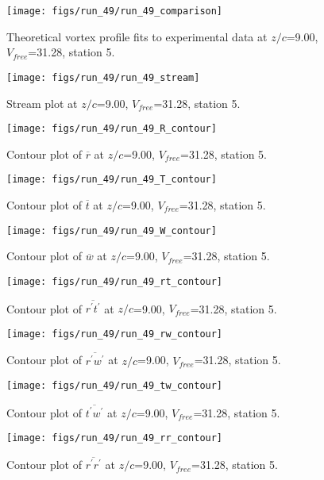 \begin{figure}[H]
\centering
\texttt{[image: figs/run\_49/run\_49\_comparison]}
\caption{Theoretical vortex profile fits to experimental data at $z/c$=9.00, $V_{free}$=31.28, station 5.}
\end{figure}


\begin{figure}[H]
\centering
\texttt{[image: figs/run\_49/run\_49\_stream]}
\caption{Stream plot at $z/c$=9.00, $V_{free}$=31.28, station 5.}
\end{figure}


\begin{figure}[H]
\centering
\texttt{[image: figs/run\_49/run\_49\_R\_contour]}
\caption{Contour plot of $\overline{r}$ at $z/c$=9.00, $V_{free}$=31.28, station 5.}
\end{figure}


\begin{figure}[H]
\centering
\texttt{[image: figs/run\_49/run\_49\_T\_contour]}
\caption{Contour plot of $\overline{t}$ at $z/c$=9.00, $V_{free}$=31.28, station 5.}
\end{figure}


\begin{figure}[H]
\centering
\texttt{[image: figs/run\_49/run\_49\_W\_contour]}
\caption{Contour plot of $\overline{w}$ at $z/c$=9.00, $V_{free}$=31.28, station 5.}
\end{figure}


\begin{figure}[H]
\centering
\texttt{[image: figs/run\_49/run\_49\_rt\_contour]}
\caption{Contour plot of $\overline{r^\prime t^\prime}$ at $z/c$=9.00, $V_{free}$=31.28, station 5.}
\end{figure}


\begin{figure}[H]
\centering
\texttt{[image: figs/run\_49/run\_49\_rw\_contour]}
\caption{Contour plot of $\overline{r^\prime w^\prime}$ at $z/c$=9.00, $V_{free}$=31.28, station 5.}
\end{figure}


\begin{figure}[H]
\centering
\texttt{[image: figs/run\_49/run\_49\_tw\_contour]}
\caption{Contour plot of $\overline{t^\prime w^\prime}$ at $z/c$=9.00, $V_{free}$=31.28, station 5.}
\end{figure}


\begin{figure}[H]
\centering
\texttt{[image: figs/run\_49/run\_49\_rr\_contour]}
\caption{Contour plot of $\overline{r^\prime r^\prime}$ at $z/c$=9.00, $V_{free}$=31.28, station 5.}
\end{figure}


